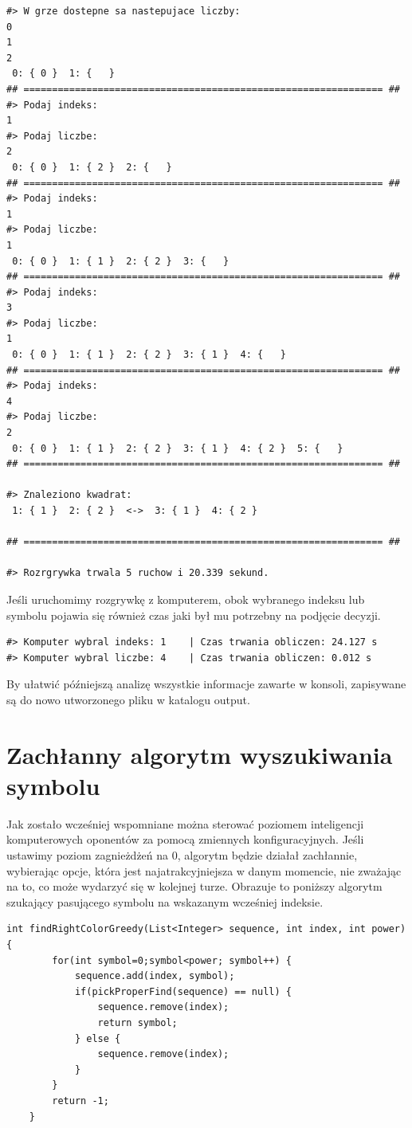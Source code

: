 \documentclass[document]{xmgr}
\begin{document}
\begin{lstlisting}
#> W grze dostepne sa nastepujace liczby: 
0
1
2
 0: { 0 }  1: {   } 
## =============================================================== ##
#> Podaj indeks: 
1
#> Podaj liczbe: 
2
 0: { 0 }  1: { 2 }  2: {   } 
## =============================================================== ##
#> Podaj indeks: 
1
#> Podaj liczbe: 
1
 0: { 0 }  1: { 1 }  2: { 2 }  3: {   } 
## =============================================================== ##
#> Podaj indeks: 
3
#> Podaj liczbe: 
1
 0: { 0 }  1: { 1 }  2: { 2 }  3: { 1 }  4: {   } 
## =============================================================== ##
#> Podaj indeks: 
4
#> Podaj liczbe: 
2
 0: { 0 }  1: { 1 }  2: { 2 }  3: { 1 }  4: { 2 }  5: {   } 
## =============================================================== ##

#> Znaleziono kwadrat:  
 1: { 1 }  2: { 2 }  <->  3: { 1 }  4: { 2 } 

## =============================================================== ##

#> Rozrgrywka trwala 5 ruchow i 20.339 sekund.
\end{lstlisting}
Jeśli uruchomimy rozgrywkę z komputerem, obok wybranego indeksu lub symbolu pojawia się również czas jaki był mu potrzebny na podjęcie decyzji.

\begin{lstlisting}
#> Komputer wybral indeks: 1 	| Czas trwania obliczen: 24.127 s
#> Komputer wybral liczbe: 4 	| Czas trwania obliczen: 0.012 s\end{lstlisting}

By ułatwić późniejszą analizę wszystkie informacje zawarte w konsoli, zapisywane są do nowo utworzonego pliku w katalogu output.

\section{Zachłanny algorytm wyszukiwania symbolu}
Jak zostało wcześniej wspomniane można sterować poziomem inteligencji komputerowych oponentów za pomocą zmiennych konfiguracyjnych. Jeśli ustawimy poziom zagnieżdżeń na 0, algorytm będzie działał zachłannie, wybierając opcje, która jest najatrakcyjniejsza w danym momencie, nie zważając na to, co może wydarzyć się w kolejnej turze. Obrazuje to poniższy algorytm szukający pasującego symbolu na wskazanym wcześniej indeksie.

\begin{lstlisting}[frame=single]
int findRightColorGreedy(List<Integer> sequence, int index, int power) {
		for(int symbol=0;symbol<power; symbol++) {
			sequence.add(index, symbol);
			if(pickProperFind(sequence) == null) {
				sequence.remove(index);
				return symbol;
			} else {
				sequence.remove(index);
			}
		}
		return -1;
	}
\end{lstlisting}
\end{document}
